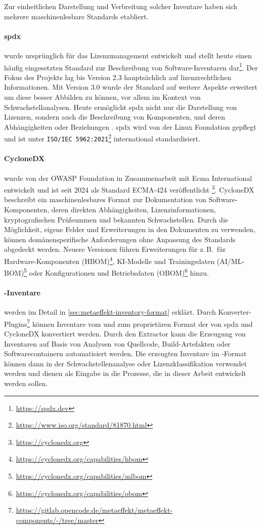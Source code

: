 Zur einheitlichen Darstellung und Verbreitung solcher Inventare haben sich mehrere maschinenlesbare Standards etabliert.

\paragraph{\acrfull{spdx}}
wurde ursprünglich für das Lizenzmanagement entwickelt und stellt heute einen häufig eingesetzten Standard zur Beschreibung von Software-Inventaren dar\footnote{\url{https://spdx.dev}}.
Der Fokus des Projekts lag bis Version 2.3 hauptsächlich auf lizenzrechtlichen Informationen.
Mit Version 3.0 wurde der Standard auf weitere Aspekte erweitert um diese besser Abbilden zu können, vor allem im Kontext von Schwachstellanalysen.
Heute ermöglicht \acrshort{spdx} nicht nur die Darstellung von Lizenzen, sondern auch die Beschreibung von Komponenten, und deren Abhängigkeiten oder Beziehungen \autocite{spdxOverview1june2024}.
\acrshort{spdx} wird von der Linux Foundation gepflegt und ist unter \texttt{ISO/IEC 5962:2021}\footnote{\url{https://www.iso.org/standard/81870.html}} international standardisiert.

\paragraph{CycloneDX}
wurde von der OWASP Foundation in Zusammenarbeit mit Ecma International entwickelt und ist seit 2024 als Standard ECMA-424 veröffentlicht \autocite{CycloneDX2024Spec, ecma424:2024}\footnote{\url{https://cyclonedx.org}}.
CycloneDX beschreibt ein maschinenlesbares Format zur Dokumentation von Software-Komponenten, deren direkten Abhängigkeiten, Lizenzinformationen, kryptografischen Prüfsummen und bekannten Schwachstellen.
Durch die Möglichkeit, eigene Felder und Erweiterungen in den Dokumenten zu verwenden, können domänenspezifische Anforderungen ohne Anpassung des Standards abgedeckt werden.
Neuere Versionen führen Erweiterungen für z.\,B.\ für Hardware-Komponenten (HBOM)\footnote{\url{https://cyclonedx.org/capabilities/hbom}}, KI-Modelle und Trainingsdaten (AI/ML-BOM)\footnote{\url{https://cyclonedx.org/capabilities/mlbom}} oder Konfigurationen und Betriebsdaten (OBOM)\footnote{\url{https://cyclonedx.org/capabilities/obom}} hinzu.

\paragraph{\metaeffekt-Inventare}
werden im Detail in \autoref{sec:metaeffekt-inventory-format} erklärt.
Durch Konverter-Plugins\footnote{\url{https://gitlab.opencode.de/metaeffekt/metaeffekt-components/-/tree/master}} können Inventare vom und zum proprietären Format der \metaeffektsp von \acrshort{spdx} und CycloneDX konvertiert werden.
Durch den \metaeffektsp Extractor kann die Erzeugung von Inventaren auf Basis von Analysen von Quellcode, Build-Artefakten oder Softwarecontainern automatisiert werden.
Die erzeugten Inventare im \metaeffekt-Format können dann in der Schwachstellenanalyse oder Lizenzklassifikation verwendet werden und dienen als Eingabe in die Prozesse, die in dieser Arbeit entwickelt werden sollen.

